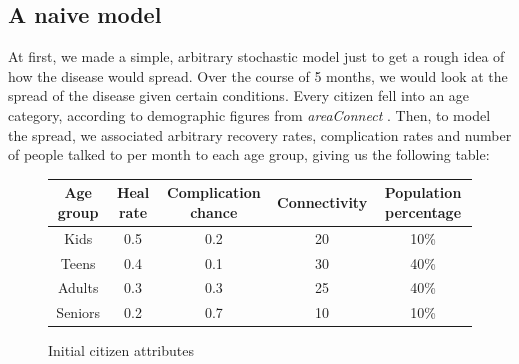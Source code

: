 \documentclass[titlepage]{article}
\begin{document}
\subsection{A naive model}
\par At first, we made a simple, arbitrary stochastic model just to get a rough idea of how the disease would spread. Over the course of 5 months, we would look at the spread of the disease given certain conditions. Every citizen fell into an age category, according to demographic figures from \emph{areaConnect} \cite{areconnect}. Then, to model the spread, we associated arbitrary recovery rates, complication rates and number of people talked to per month to each age group, giving us the following table:
\begin{figure}[h!]
\centering
\begin{tabular}{c|c|c|c|c}
Age group & Heal rate & Complication chance & Connectivity & Population percentage\\ \hline
Kids & 0.5 & 0.2 & 20 & 10\%\\
Teens & 0.4 & 0.1 & 30 & 40\%\\
Adults & 0.3 & 0.3 & 25 & 40\%\\
Seniors & 0.2 & 0.7 & 10 & 10\%
\end{tabular}
\caption{Initial citizen attributes}
\end{figure}
\end{document}
